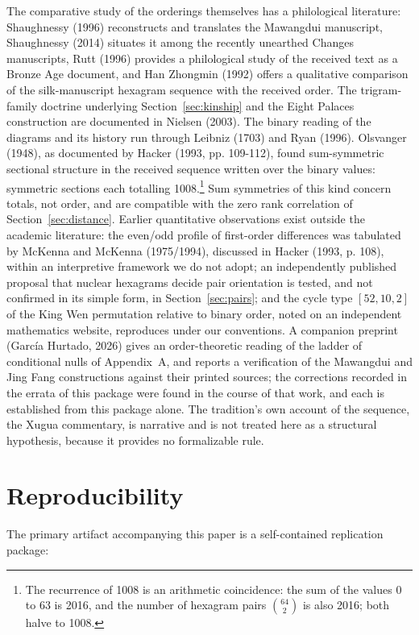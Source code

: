 \documentclass[11pt]{article}
\begin{document}
The comparative study of the orderings themselves has a philological literature: Shaughnessy (1996) reconstructs and translates the Mawangdui manuscript, Shaughnessy (2014) situates it among the recently unearthed Changes manuscripts, Rutt (1996) provides a philological study of the received text as a Bronze Age document, and Han Zhongmin (1992) offers a qualitative comparison of the silk-manuscript hexagram sequence with the received order. The trigram-family doctrine underlying Section~\ref{sec:kinship} and the Eight Palaces construction are documented in Nielsen (2003). The binary reading of the diagrams and its history run through Leibniz (1703) and Ryan (1996). Olsvanger (1948), as documented by Hacker (1993, pp. 109-112), found sum-symmetric sectional structure in the received sequence written over the binary values: symmetric sections each totalling 1008.\footnote{The recurrence of 1008 is an arithmetic coincidence: the sum of the values 0 to 63 is 2016, and the number of hexagram pairs $\binom{64}{2}$ is also 2016; both halve to 1008.} Sum symmetries of this kind concern totals, not order, and are compatible with the zero rank correlation of Section~\ref{sec:distance}. Earlier quantitative observations exist outside the academic literature: the even/odd profile of first-order differences was tabulated by McKenna and McKenna (1975/1994), discussed in Hacker (1993, p. 108), within an interpretive framework we do not adopt; an independently published proposal that nuclear hexagrams decide pair orientation is tested, and not confirmed in its simple form, in Section~\ref{sec:pairs}; and the cycle type $[52, 10, 2]$ of the King Wen permutation relative to binary order, noted on an independent mathematics website, reproduces under our conventions. A companion preprint (García Hurtado, 2026) gives an order-theoretic reading of the ladder of conditional nulls of Appendix~A, and reports a verification of the Mawangdui and Jing Fang constructions against their printed sources; the corrections recorded in the errata of this package were found in the course of that work, and each is established from this package alone. The tradition's own account of the sequence, the Xugua commentary, is narrative and is not treated here as a structural hypothesis, because it provides no formalizable rule.

\section{Reproducibility}

The primary artifact accompanying this paper is a self-contained replication package:
\end{document}
